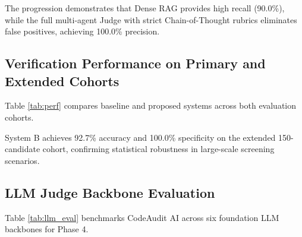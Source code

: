 \documentclass[conference]{IEEEtran}
\begin{document}
The progression demonstrates that Dense RAG provides high recall (90.0\%), while the full multi-agent Judge with strict Chain-of-Thought rubrics eliminates false positives, achieving 100.0\% precision.

\subsection{Verification Performance on Primary and Extended Cohorts}
Table \ref{tab:perf} compares baseline and proposed systems across both evaluation cohorts.

\begin{table}[htbp]
\caption{Performance on Primary Benchmark and Extended Cohort}
\label{tab:perf}
\centering
{}
\end{table}

System B achieves 92.7\% accuracy and 100.0\% specificity on the extended 150-candidate cohort, confirming statistical robustness in large-scale screening scenarios.

\subsection{LLM Judge Backbone Evaluation}
Table \ref{tab:llm_eval} benchmarks CodeAudit AI across six foundation LLM backbones for Phase 4.
\end{document}
